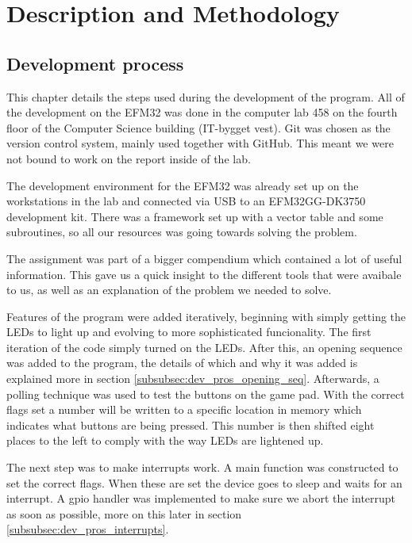 \section{Description and Methodology}
\label{chap:description}

\subsection{Development process}
\label{subsec:development_process}

This chapter details the steps used during the development of the program. All of the development on the EFM32 was done in the computer lab 458 on the fourth floor of the Computer Science building (IT-bygget vest). Git was chosen as the version control system, mainly used together with GitHub. This meant we were not bound to work on the report inside of the lab.

The development environment for the EFM32 was already set up on the workstations in the lab and connected via USB to an EFM32GG-DK3750 development kit. There was a framework set up with a vector table and some subroutines, so all our resources was going towards solving the problem.

The assignment was part of a bigger compendium which contained a lot of useful information. This gave us a quick insight to the different tools that were avaibale to us, as well as an explanation of the problem we needed to solve.

Features of the program were added iteratively, beginning with simply getting the LEDs to light up and evolving to more sophisticated funcionality. The first iteration of the code simply turned on the LEDs. After this, an opening sequence was added to the program, the details of which and why it was added is explained more in section \ref{subsubsec:dev_pros_opening_seq}. Afterwards, a polling technique was used to test the buttons on the game pad. With the correct flags set a number will be written to a specific location in memory which indicates what buttons are being pressed. This number is then shifted eight places to the left to comply with the way LEDs are lightened up.

The next step was to make interrupts work. A main function was constructed to set the correct flags. When these are set the device goes to sleep and waits for an interrupt. A gpio handler was implemented to make sure we abort the interrupt as soon as possible, more on this later in section \ref{subsubsec:dev_pros_interrupts}.

